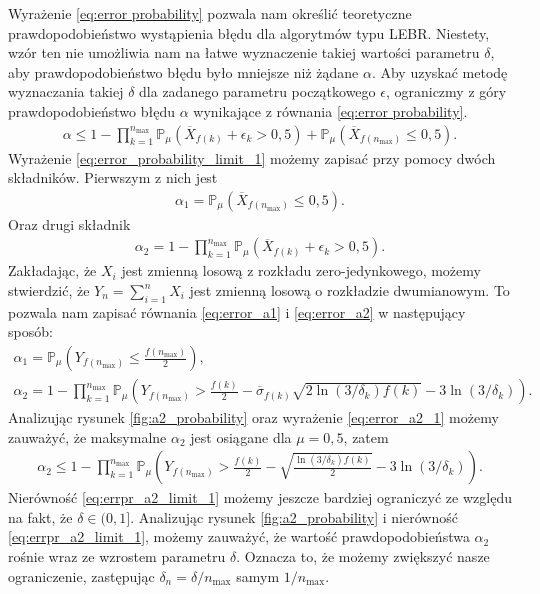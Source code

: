 \documentclass[inzynierska]{pwr_wmat_praca_dyplomowa}
\theoremstyle{plain}
\numberwithin{theorem}{chapter}
\theoremstyle{definition}
\numberwithin{theorem}{chapter}
\newcommand{\probP}{\mathbb{P}}
\newcommand{\nmax}{n_{\text{max}}}
\begin{document}
	Wyrażenie \eqref{eq:error probability} pozwala nam określić teoretyczne prawdopodobieństwo wystąpienia błędu dla algorytmów typu LEBR. Niestety, wzór ten nie umożliwia nam na łatwe wyznaczenie takiej wartości parametru $\delta$, aby prawdopodobieństwo błędu było mniejsze niż żądane $\alpha$. Aby uzyskać metodę wyznaczania takiej $\delta$ dla zadanego parametru początkowego $\epsilon$, ograniczmy z góry prawdopodobieństwo błędu $\alpha$ wynikające z równania \eqref{eq:error probability}.
	\begin{gather}
		\label{eq:error_probability_limit_1}
		\alpha \le
		  1-\prod^{\nmax}_{k=1} \probP_{\mu}(\overline{X}_{f(k)} +  \epsilon_{k} > 0,5) +
		 \probP_{\mu}(\overline{X}_{f(\nmax)}\le 0,5).
	\end{gather}
	\noindent
	Wyrażenie \eqref{eq:error_probability_limit_1} możemy zapisać przy pomocy dwóch składników. Pierwszym z nich jest 
	\begin{gather}
		\alpha_1 = \label{eq:error_a1}
		\probP_{\mu}(\overline{X}_{f(\nmax)} \le 0,5).
	\end{gather}
	Oraz drugi składnik
	\begin{gather}
		\label{eq:error_a2}
		\alpha_2 = 1 - \prod^{\nmax}_{k=1} \probP_{\mu}(\overline{X}_{f(k)} +  \epsilon_{k} > 0,5).
	\end{gather}
	Zakładając, że $X_i$ jest zmienną losową z rozkładu zero-jedynkowego, możemy stwierdzić, że $Y_n = \sum_{i=1}^{n}X_i$ jest zmienną losową o rozkładzie dwumianowym. To pozwala nam zapisać równania \eqref{eq:error_a1} i \eqref{eq:error_a2} w następujący sposób:
	\begin{gather}
		\label{eq:error_a1_1}
		\alpha_1 = \probP_{\mu}\left( Y_{f(\nmax)} \le  \frac{f(\nmax)}{2} \right), \\
		\label{eq:error_a2_1}
		\alpha_2 = 1 - \prod_{k=1}^{\nmax} \probP_{\mu}\left( Y_{f(\nmax)}  > \frac{f(k)}{2} - \overline{\sigma}_{f(k)} \sqrt{2\ln(3/\delta_k)f(k)} - 3  \ln{(3 / \delta_k)} \right).
	\end{gather}
	Analizując rysunek \ref{fig:a2_probability} oraz wyrażenie \eqref{eq:error_a2_1} możemy zauważyć, że maksymalne $\alpha_2$ jest osiągane dla $\mu = 0,5$, zatem
	\begin{align}
		\label{eq:errpr_a2_limit_1}
		\alpha_2 \le 1 - \prod_{k=1}^{\nmax} \probP_{\mu}\left( Y_{f(\nmax)}  > \frac{f(k)}{2} -  \sqrt{\frac{\ln(3/\delta_k)f(k)}{2}} - 3  \ln{(3 / \delta_k)} \right).
	\end{align}
	Nierówność \eqref{eq:errpr_a2_limit_1} możemy jeszcze bardziej ograniczyć ze względu na fakt, że $\delta\in(0, 1]$. Analizując rysunek \ref{fig:a2_probability} i nierówność \eqref{eq:errpr_a2_limit_1}, możemy zauważyć, że wartość prawdopodobieństwa $\alpha_2$ rośnie wraz ze wzrostem parametru $\delta$. Oznacza to, że możemy zwiększyć nasze ograniczenie, zastępując $\delta_n = \delta/\nmax$ samym $1/\nmax$.
\end{document}
